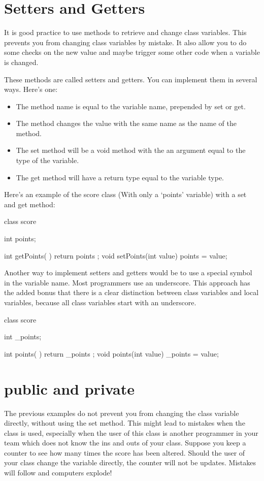\section{Setters and Getters}

It is good practice to use methods to retrieve and change class variables. This prevents you from changing class variables by mistake. It also allow you to do some checks on the new value and maybe trigger some other code when a variable is changed.

These methods are called setters and getters. You can implement them in several ways. Here's one:

\begin{itemize}
\item The method name is equal to the variable name, prepended by set or get.
\item The method changes the value with the same name as the name of the method.
\item The set method will be a void method with the an argument equal to the type of the variable.
\item The get method will have a return type equal to the variable type.
\end{itemize}

Here's an example of the score class (With only a `points' variable) with a set and get method:

\begin{code}
class score {
  int points;
  
  int  getPoints(         ) { return points ; }
  void setPoints(int value) { points = value; }
}
\end{code}

Another way to implement setters and getters would be to use a special symbol in the variable name. Most programmers use an underscore. This approach has the added bonus that there is a clear distinction between class variables and local variables, because all class variables start with an underscore.

\begin{code}
class score {
  int _points;
  
  int  points(         ) { return _points ; }
  void points(int value) { _points = value; }
}
\end{code}

\section{public and private}
The previous examples do not prevent you from changing the class variable directly, without using the set method. This might lead to mistakes when the class is used, especially when the user of this class is another programmer in your team which does not know the ins and outs of your class. Suppose you keep a counter to see how many times the score has been altered. Should the user of your class change the variable directly, the counter will not be updates. Mistakes will follow and computers explode!

